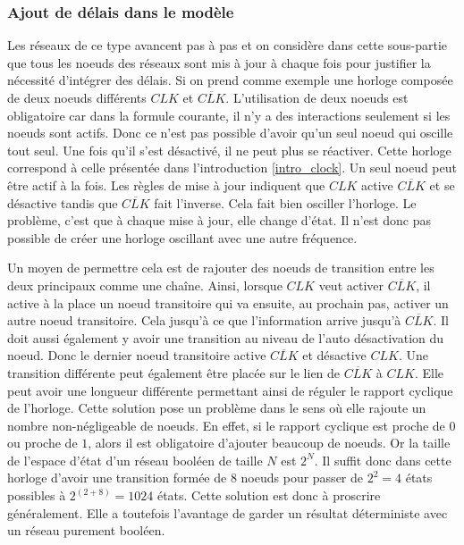 \documentclass[11pt, a4paper]{article}
\begin{document}
\subsubsection{Ajout de délais dans le modèle}
Les réseaux de ce type avancent pas à pas et on considère dans cette
sous-partie que tous les noeuds des réseaux sont mis à jour à chaque fois pour
justifier la nécessité d'intégrer des délais. Si on prend comme exemple une
horloge composée de deux noeuds différents $CLK$ et $\overline{CLK}$.
L'utilisation de deux noeuds est obligatoire car dans la formule courante, il
n'y a des interactions seulement si les noeuds sont actifs. Donc ce n'est pas
possible d'avoir qu'un seul noeud qui oscille tout seul. Une fois qu'il s'est
désactivé, il ne peut plus se r\'eactiver. Cette horloge correspond à celle
présentée dans l'introduction \ref{intro_clock}. Un seul noeud peut être
actif à la fois. Les règles de mise à jour indiquent que $CLK$ active $\overline{CLK}$ et
se désactive tandis que $\overline{CLK}$ fait l'inverse. Cela fait bien
osciller l'horloge. Le problème, c'est que à chaque mise à jour, elle change d'\'etat.
Il n'est donc pas possible de créer une horloge oscillant avec une autre
fréquence.

Un moyen de permettre cela est de rajouter des noeuds de transition entre les
deux principaux comme une chaîne. Ainsi, lorsque $CLK$ veut activer
$\overline{CLK}$, il active à la place un noeud transitoire qui va ensuite, au
prochain pas, activer un autre noeud transitoire. Cela jusqu'à ce que
l'information arrive jusqu'à $\overline{CLK}$. Il doit aussi également y avoir
une transition au niveau de l'auto désactivation du noeud. Donc le dernier
noeud transitoire active $\overline{CLK}$ et désactive $CLK$. Une transition
différente peut également être placée sur le lien de $\overline{CLK}$ à $CLK$.
Elle peut avoir une longueur différente permettant ainsi de réguler le rapport
cyclique de l'horloge. Cette solution pose un problème dans le sens où elle
rajoute un nombre non-négligeable de noeuds. En effet, si le rapport cyclique
est proche de $0$ ou proche de $1$, alors il est obligatoire d'ajouter beaucoup
de noeuds. Or la taille de l'espace d'état d'un réseau booléen de taille $N$
est $2^N$. Il suffit donc dans cette horloge d'avoir une transition formée de
8 noeuds pour passer de $2^2=4$ états possibles à $2^{(2+8)}=1024$ états. Cette
solution est donc à proscrire généralement. Elle a toutefois l'avantage de
garder un résultat déterministe avec un réseau purement booléen.
\end{document}
